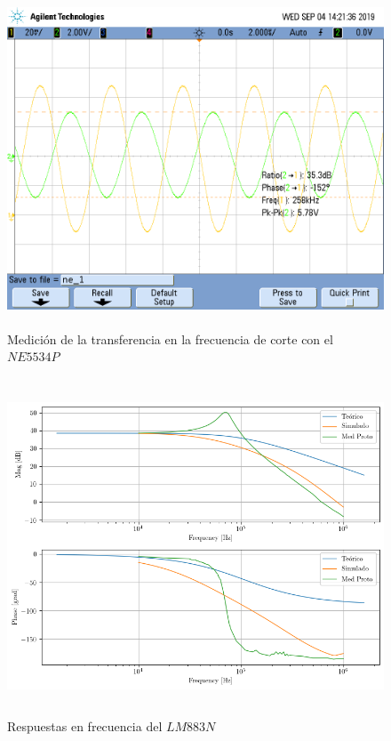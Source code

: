 \begin{figure}
\begin{center}
\includegraphics[height=10cm]{./rsc/ne_1.png}
\caption{Medición de la transferencia en la frecuencia de corte con el $NE5534P$}
\label{fig:e2_ne_fB}
\end{center}
\end{figure}

\begin{figure}
\begin{center}
\includegraphics[height=10cm]{./rsc/lm_bode_proto.png}
\caption{Respuestas en frecuencia del $LM883N$}
\label{fig:e2_lm_bode}
\end{center}
\end{figure}

